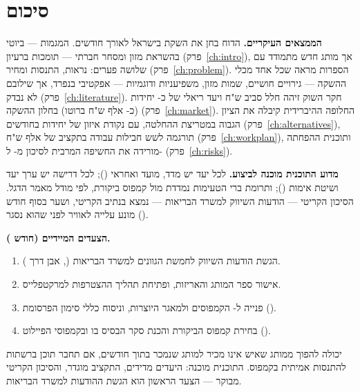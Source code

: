 \chapter{סיכום}
\label{ch:summary}

\textbf{הממצאים העיקריים.} הדוח בחן את השקת  בישראל לאורך 
חודשים. המגמות --- ביוטי בהשראת מזון ומסחר חברתי --- תומכות ברעיון
(פרק~\ref{ch:intro}), אך מותג חדש מתמודד עם שלושה פערים: נראות, התנסות ומחיר
(פרק~\ref{ch:problem}). הספרות מראה שכל אחד מכלי ההשקה --- גירויים חושיים, שמות
מזון, משפיעניות ודוגמיות --- אפקטיבי בנפרד, אך שילובם לא נבדק
(פרק~\ref{ch:literature}). חקר השוק זיהה חלל  סביב  ש"ח ויעד
ריאלי של כ- יחידות (כ- אלף ש"ח ברוטו) בחלון ההשקה (פרק~\ref{ch:market}). החלופה ההיברידית
קיבלה את הציון הגבוה במטריצת ההחלטה, עם נקודת איזון של  יחידות בחודשים
 (פרק~\ref{ch:alternatives}), תורגמה לשש חבילות עבודה
בתקציב של  אלף ש"ח (פרק~\ref{ch:workplan}), ותוכנית ההפחתה מורידה את
החשיפה המרבית לסיכון מ- ל- (פרק~\ref{ch:risks}).

\textbf{מדוע התוכנית מוכנה לביצוע.} לכל יעד יש מדד, מועד ואחראי ();
לכל דרישה יש ערך יעד ושיטת אימות (); ותרומת ברי הטעימות
נמדדת מול קמפוס ביקורת, לפי מודל מאמר הדגל. הסיכון הקריטי --- הודעות השיווק
למשרד הבריאות --- נמצא בנתיב הקריטי, ושער  בסוף חודש 
() מונע עלייה לאוויר לפני שהוא נסגר.

\textbf{הצעדים המיידיים (חודש ).}
\begin{enumerate}
  \item הגשת הודעות השיווק לחמשת הגוונים למשרד הבריאות (, אבן דרך ).
  \item אישור ספר המותג והאריזות, ופתיחת תהליך ההצטרפות למרקטפלייס.
  \item פנייה ל- הקמפוסים ולמאגר היוצרות, וניסוח כללי סימון הפרסומת ().
  \item בחירת קמפוס הביקורת והכנת סקר הבסיס בו ובקמפוסי הפיילוט ().
\end{enumerate}

\begin{keymessage}
 יכולה להפוך ממותג שאיש אינו מכיר למותג שנמכר בתוך  חודשים, אם
תחבר תוכן ברשתות להתנסות אמיתית בקמפוס. התוכנית מוכנה: היעדים מדידים, התקציב
מוגדר, והסיכון הקריטי מבוקר --- הצעד הראשון הוא הגשת ההודעות למשרד הבריאות.
\end{keymessage}
